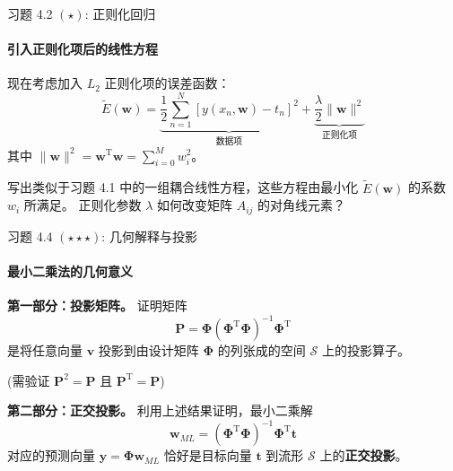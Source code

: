 \documentclass[12pt, aspectratio=169]{beamer}
\begin{document}
\begin{frame}{习题 4.2 $(\star)$: 正则化回归}
    \framesubtitle{引入正则化项后的线性方程}
    现在考虑加入 $L_2$ 正则化项的误差函数：
    \begin{equation}
        \tilde{E} (\mathbf{w}) = \underbrace{\frac{1}{2}\sum_{n=1}^{N} \left[ y(x_n,\mathbf{w})-t_n \right]^2}_{\text{数据项}} + \underbrace{\frac{\lambda}{2} \lVert \mathbf{w} \rVert^2}_{\text{正则化项}}
    \end{equation}
    其中 $\lVert \mathbf{w} \rVert^2 = \mathbf{w}^\mathrm{T}\mathbf{w} = \sum_{i=0}^M w_i^2$。
    
    \vspace{0.5em}
    写出类似于习题 4.1 中的一组耦合线性方程，这些方程由最小化 $\tilde{E}(\mathbf{w})$ 的系数 $w_i$ 所满足。
    正则化参数 $\lambda$ 如何改变矩阵 $A_{ij}$ 的对角线元素？
    
\end{frame}

\begin{frame}{习题 4.4 $(\star\star\star)$: 几何解释与投影}
    \framesubtitle{最小二乘法的几何意义}
    
    \textbf{第一部分：投影矩阵。}
    证明矩阵
    \begin{equation}
        \mathbf{P} = \boldsymbol{\Phi}(\boldsymbol{\Phi}^{\mathrm{T}}\boldsymbol{\Phi})^{-1}\boldsymbol{\Phi}^{\mathrm{T}}
    \end{equation}
    是将任意向量 $\mathbf{v}$ 投影到由设计矩阵 $\boldsymbol{\Phi}$ 的列张成的空间 $\mathcal{S}$ 上的投影算子。

    (需验证 $\mathbf{P}^2=\mathbf{P}$ 且 $\mathbf{P}^\mathrm{T}=\mathbf{P}$)
    
    \vspace{1em}
    \textbf{第二部分：正交投影。}
    利用上述结果证明，最小二乘解
    \begin{equation}
        \mathbf{w}_{ML} = (\boldsymbol{\Phi}^{\mathrm{T}}\boldsymbol{\Phi})^{-1}\boldsymbol{\Phi}^{\mathrm{T}} \mathbf{t}
    \end{equation}
    对应的预测向量 $\mathbf{y} = \boldsymbol{\Phi}\mathbf{w}_{ML}$ 恰好是目标向量 $\mathbf{t}$ 到流形 $\mathcal{S}$ 上的\textbf{正交投影}。
    
\end{frame}
\end{document}
